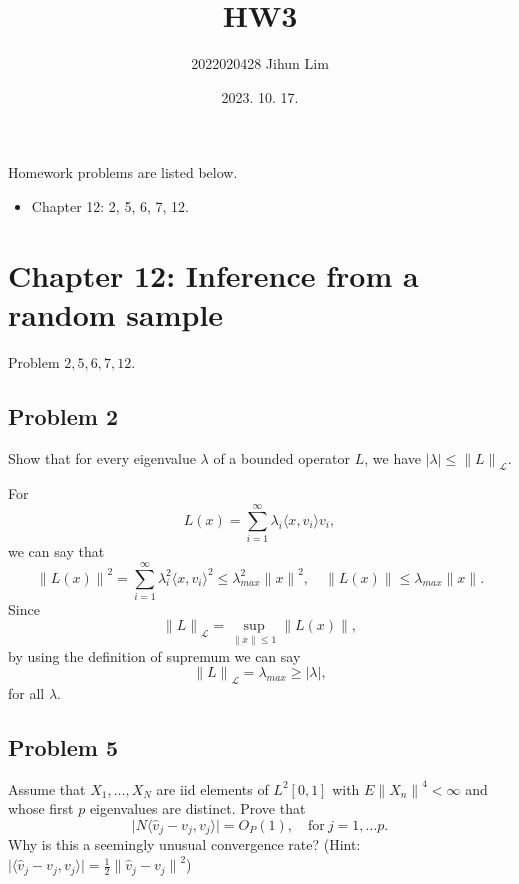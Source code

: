 \documentclass{article}
\title{HW3}
\author{ 2022020428 Jihun Lim}
\date{2023. 10. 17. }
\theoremstyle{definition}
\numberwithin{equation}{section}
\begin{document}
\maketitle

Homework problems are listed below.
\begin{itemize}
\item  Chapter 12: 2, 5, 6, 7, 12.
\end{itemize}


\section{Chapter 12: Inference from a random sample}

Problem $2, 5, 6, 7, 12$.

\subsection{Problem 2}

\begin{problem}
Show that for every eigenvalue $\lambda$ of a bounded operator $L$, 
we have $ \vert \lambda \vert \leq { \lVert L \rVert}_{ \mathcal{L} }.$
\end{problem}

\begin{mysol}
For 
$$
L(x) = \sum_{i=1}^{\infty} \lambda_{i} \langle x, v_{i} \rangle v_{i},
$$
we can say that
$$
{ \lVert L(x) \rVert }^{2} = \sum_{i=1}^{\infty} \lambda_{i}^{2} {\langle x, v_{i} \rangle}^{2} \leq \lambda_{max}^{2} {\lVert x \rVert }^{2}, \quad \lVert L(x) \rVert \leq \lambda_{max} \lVert x \rVert .
$$
Since 
$${ \lVert L \rVert}_{ \mathcal{L} } = \sup_{\lVert x \rVert \leq 1} \lVert L(x) \rVert ,$$
by using the definition of supremum we can say
$${ \lVert L \rVert}_{ \mathcal{L} } = \lambda_{max} \geq \vert \lambda \vert ,$$
for all $\lambda$.

\end{mysol}

\subsection{Problem 5}

\begin{problem}

Assume that $X_{1}, \ldots, X_{N}$ are iid elements of $L^{2}[0,1]$ with $E{\lVert X_{n} \rVert}^{4} < \infty$ and whose first $p$ eigenvalues are distinct. Prove that $$\vert N \langle \hat{v}_{j} - v_{j}, v_{j} \rangle \vert = O_{P}(1), \quad \text{for} \ j = 1, \ldots p.$$
Why is this a seemingly unusual convergence rate? (Hint: $\vert \langle \hat{v}_{j} - v_{j}, v_{j} \rangle \vert = \frac{1}{2}{\lVert \hat{v}_{j} - v_{j} \rVert}^{2}$)

\end{problem}
\end{document}
